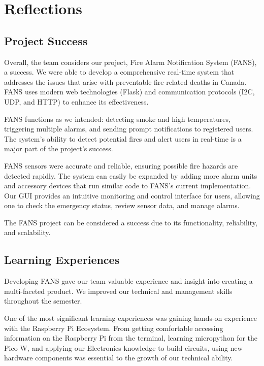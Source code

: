 \section{Reflections}

\subsection{Project Success}

Overall, the team considers our project, Fire Alarm Notification System (FANS), a success. We were able to develop a
comprehensive real-time system that addresses the issues that arise with preventable fire-related deaths in Canada.
FANS uses modern web technologies (Flask) and communication protocols (I2C, UDP, and HTTP) to enhance its
effectiveness.

FANS functions as we intended: detecting smoke and high temperatures, triggering multiple alarms, and sending prompt
notifications to registered users. The system's ability to detect potential fires and alert users in real-time is a
major part of the project’s success.

FANS sensors were accurate and reliable, ensuring possible fire hazards are detected rapidly. The system can easily be
expanded by adding more alarm units and accessory devices that run similar code to FANS’s current implementation. Our
GUI provides an intuitive monitoring and control interface for users, allowing one to check the emergency status,
review sensor data, and manage alarms.

The FANS project can be considered a success due to its functionality, reliability, and scalability.

\subsection{Learning Experiences}

Developing FANS gave our team valuable experience and insight into creating a multi-faceted product. We improved our
technical and management skills throughout the semester.

One of the most significant learning experiences was gaining hands-on experience with the Raspberry Pi Ecosystem. From
getting comfortable accessing information on the Raspberry Pi from the terminal, learning micropython for the Pico W,
and applying our Electronics knowledge to build circuits, using new hardware components was essential to the growth of
our technical ability.


